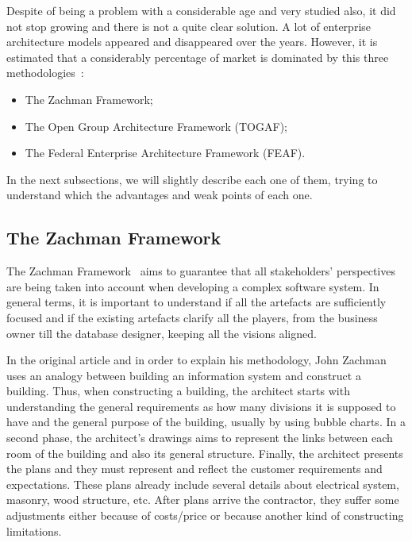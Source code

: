 Despite of being a problem with a considerable age and very studied also, it did not stop growing and there is not a quite clear solution. A lot of enterprise architecture models appeared and disappeared over the years. However, it is estimated that a considerably percentage of market is dominated by this three methodologies~\citep{Sessions2007}:

\begin{itemize}
\item The Zachman Framework;
\item The Open Group Architecture Framework (TOGAF);
\item The Federal Enterprise Architecture Framework (FEAF).
\end{itemize}

In the next subsections, we will slightly describe each one of them, trying to understand which the advantages and weak points of each one. 











\subsection{The Zachman Framework} \label{sec:zachman-fw}

The Zachman Framework~\citep{Zachman1987} aims to guarantee that all stakeholders' perspectives are being taken into account when developing a complex software system. In general terms, it is important to understand if all the artefacts are sufficiently focused and if the existing artefacts clarify all the players, from the business owner till the database designer, keeping all the visions aligned.

In the original article and in order to explain his methodology, John Zachman uses an analogy between building an information system and construct a building. Thus, when constructing a building, the architect starts with understanding the general requirements as how many divisions it is supposed to have and the general purpose of the building, usually by using bubble charts. In a second phase, the architect's drawings aims to represent the links between each room of the building and also its general structure. Finally, the architect presents the plans and they must represent and reflect the customer requirements and expectations. These plans already include several details about electrical system, masonry, wood structure, etc. After plans arrive the contractor, they suffer some adjustments either because of costs/price or because another kind of constructing limitations.

